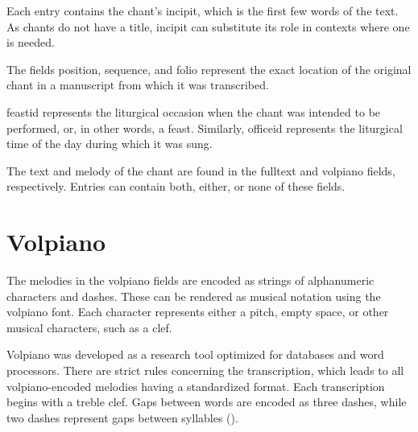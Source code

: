 Each entry contains the chant's incipit, which is the first few words of the text. As chants do not have a title, incipit can substitute its role
in contexts where one is needed.

The fields position, sequence, and folio represent the exact location of the original chant in a manuscript from which it was transcribed.

feastid represents the liturgical occasion when the chant was intended to be performed, or, in other words, a feast. Similarly, officeid represents
the liturgical time of the day during which it was sung.

The text and melody of the chant are found in the fulltext and volpiano fields, respectively. Entries can contain both, either, or none of these fields.

\section{Volpiano}

The melodies in the volpiano fields are encoded as strings of alphanumeric characters and dashes. These can be rendered as musical notation using
the volpiano font. Each character represents either a pitch, empty space, or other musical characters, such as a clef.

Volpiano was developed as a research tool optimized for databases and word processors. There are strict rules concerning the transcription, which leads
to all volpiano-encoded melodies having a standardized format. Each transcription begins with a treble clef. Gaps between words are encoded as three
dashes, while two dashes represent gaps between syllables (\cite{volpiano}).

